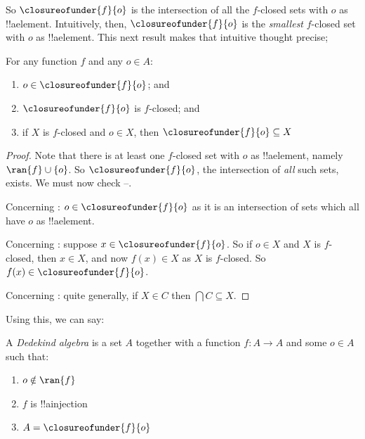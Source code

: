 So $\closureofunder{f}{o}$ is the intersection of all the $f$-closed
sets with $o$ as !!a{element}. Intuitively, then,
$\closureofunder{f}{o}$ is the \emph{smallest} $f$-closed set with $o$
as !!a{element}. This next result makes that intuitive thought
precise;
\begin{lem}
	For any function $f$ and any $o \in A$:
	\begin{enumerate}
		\item{} $o \in \closureofunder{f}{o}$; and
		\item{} $\closureofunder{f}{o}$ is $f$-closed; and
		\item{} if $X$ is $f$-closed and $o \in
		X$, then $\closureofunder{f}{o} \subseteq X$
	\end{enumerate}
\end{lem}

\begin{proof}
Note that there is at least one $f$-closed set with $o$ as !!a{element}, namely $\ran{f}\cup
\{o\}$. So $\closureofunder{f}{o}$, the intersection of \emph{all}
such sets, exists. We must now check
--.

Concerning : $o \in \closureofunder{f}{o}$ as it is an
intersection of sets which all have $o$ as !!a{element}. 

Concerning : suppose $x \in \closureofunder{f}{o}$. So if $o \in X$ and $X$ is $f$-closed, then $x \in X$, and now $f(x) \in X$ as $X$ is
$f$-closed. So $f(x) \in \closureofunder{f}{o}$.

Concerning : quite generally, if $X
\in C$ then $\bigcap C \subseteq X$.
\end{proof}

Using this, we can say:

\begin{defn}
A \emph{Dedekind algebra} is a set $A$ together with a function $f
\colon A \to A$ and some $o \in A$  such that:
	\begin{enumerate}
		\item {} $o \notin \ran{f}$
		\item {} $f$ is !!a{injection}
		\item {} $A = \closureofunder{f}{o}$
	\end{enumerate}
\end{defn}

